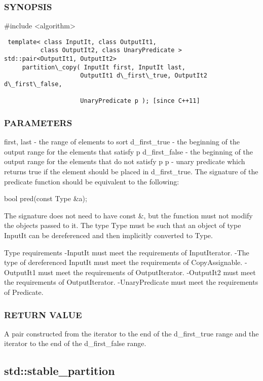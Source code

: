 \subsubsection{SYNOPSIS}
\#include <algorithm>

\begin{lstlisting}
 template< class InputIt, class OutputIt1,
          class OutputIt2, class UnaryPredicate >
std::pair<OutputIt1, OutputIt2>
     partition\_copy( InputIt first, InputIt last,
                     OutputIt1 d\_first\_true, OutputIt2 d\_first\_false,

                     UnaryPredicate p ); [since C++11]
\end{lstlisting}

\subsubsection{PARAMETERS}
first, last - the range of elements to sort
d\_first\_true - the beginning of the output range for the elements that satisfy p
d\_first\_false - the beginning of the output range for the elements that do not satisfy p
p - unary predicate which returns true  if the element should be placed in d\_first\_true.
The signature of the predicate function should be equivalent to the following:

 bool pred(const Type \&a);

The signature does not need to have const \&, but the function must not modify the objects passed to it.
The type Type must be such that an object of type InputIt can be dereferenced and then implicitly converted to Type.

 Type requirements
 -InputIt must meet the requirements of InputIterator.
 -The type of dereferenced InputIt must meet the requirements of CopyAssignable.
 -OutputIt1 must meet the requirements of OutputIterator.
 -OutputIt2 must meet the requirements of OutputIterator.
 -UnaryPredicate must meet the requirements of Predicate.

\subsubsection{RETURN VALUE}
A pair constructed from the iterator to the end of the d\_first\_true range and the iterator to the end of the d\_first\_false range.



\subsection{std::stable\_partition}

